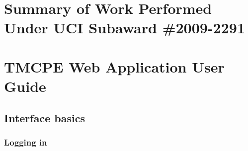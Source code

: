 \documentclass[12pt]{report}
\newif\ifuserguide %
\renewcommand{\fixme}[3][]{#1\xspace}
\newcounter{space}
\begin{document}







\appendix


\chapter{Summary of Work Performed Under UCI Subaward \#2009-2291}
\label{chap:actlog-sub}

\clearpage



\clearpage


\ifuserguide%

\chapter{TMCPE Web Application User Guide}
\label{chap:user-guide}

\fixme{crindt}{Link to the use cases (section~\ref{sec:use-cases}.)}

\section{Interface basics}
\label{sec:ui-basics}

\subsection{Logging in}
\label{sec:ui-login}
\end{document}
